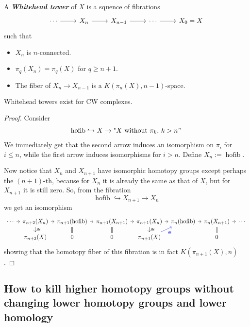 \begin{defn}
	A \textit{\textbf{Whitehead tower}} of $X$ is a squence of fibrations
	\[\begin{tikzcd}
		\cdots \arrow[r]&X_{n}\arrow[r]&X_{n-1}\arrow[r]&\cdots \arrow[r]&X_{0}=X
	\end{tikzcd}\]
	such that
	\begin{itemize}
		\item $X_n$ is $n$-connected.
		\item $\pi_{q}(X_{n})=\pi_{q}(X)$ for $q\geq n+1$.
		\item The fiber of $X_n\to  X_{n-1}$ is a $K(\pi_{n}(X),n-1)$-space.
	\end{itemize}
\end{defn}
\begin{lemma}
	Whitehead towers exist for CW complexes.
\end{lemma}
\begin{proof}
	Consider
	\[\operatorname{hofib}\hookrightarrow X\to \text{"$X$ without $\pi_{k}$, $k>n$}"\]
	We immediately get that the second arrow induces an isomorphism on $\pi_{i}$ for $i\leq n$, while the first arrow induces isomorphisms for $i>n$. Define $ X_{n}:=\operatorname{hofib}$.

	Now notice that $X_n$ and $X_{n+1}$ have isomorphic homotopy groups except perhaps the $(n+1)$-th, because for $X_{n}$ it is already the same as that of $X$, but for $X_{n+1}$ it is still zero. So, from the fibration
	\[\operatorname{hofib} \hookrightarrow X_{n+1}\to X_{n}\]
	we get an isomorphism
	\[\begin{tikzcd}[column sep=tiny,row sep=small]
		\cdots\arrow[r]&\pi_{n+2}(X_{n})\arrow[r]\arrow[d,"\cong "]&\pi_{n+1}(\operatorname{hofib} )\arrow[d,equals]\arrow[r]&\pi_{n+1}(X_{n+1})\arrow[r]\arrow[d,equals]&\pi_{n+1}(X_{n})\arrow[r]\arrow[d,"\cong "]&\pi_{n}(\operatorname{hofib} )\arrow[r]&\pi_{n}(X_{n+1})\arrow[r]\arrow[d,equals]&\cdots\\
			       &\pi_{n+2}(X)&0&0&\pi_{n+1}(X)\arrow[ur,blue,"{\color{blue}\cong }",swap]&&0&
		\end{tikzcd}\]
	showing that the homotopy fiber of this fibration is in fact $K(\pi_{n+1}(X),n)$.
	
\end{proof}

\subsection{How to kill higher homotopy groups without changing lower homotopy groups and lower homology}

